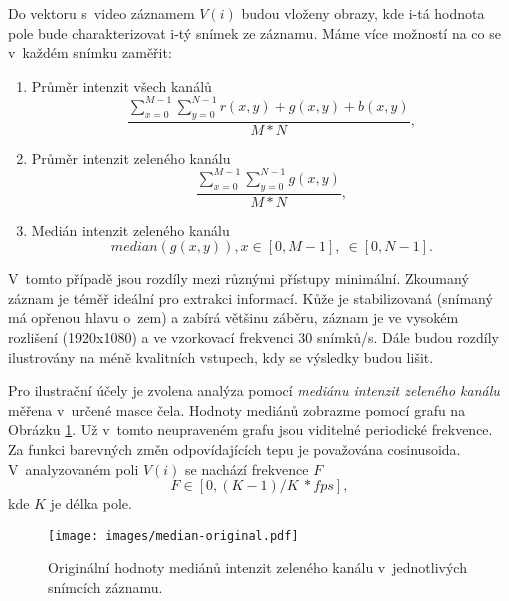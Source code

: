 \documentclass[
  digital, %
  table,   %
%
  lof,     %
  lot,     %
]{fithesis3}
\begin{document}
Do vektoru s~video záznamem $V(i)$ budou vloženy obrazy, kde i-tá hodnota pole bude charakterizovat i-tý snímek ze záznamu. Máme více možností na co se v~každém snímku zaměřit:
\begin{enumerate}
  \item{Průměr intenzit všech kanálů}
  \begin{equation}
    \frac{\sum_{x=0}^{M-1} \sum_{y=0}^{N-1} r(x,y) + g(x,y) + b(x,y)}{M*N},
    \label{suma-all-channels}
  \end{equation}
  
  \item{Průměr intenzit zeleného kanálu}
  \begin{equation}
    \frac{\sum_{x=0}^{M-1} \sum_{y=0}^{N-1} g(x,y)}{M*N},
    \label{suma-green-channel}
  \end{equation}
  
  \item{Medián intenzit zeleného kanálu}
  \begin{equation}
    median(g(x,y)), x \in [0, M-1], \ \in [0, N-1].
    \label{median-green-values}
  \end{equation}
  
\end{enumerate}

V~tomto případě jsou rozdíly mezi různými přístupy minimální. Zkoumaný záznam je téměř ideální pro extrakci informací. Kůže je stabilizovaná (snímaný má opřenou hlavu o~zem) a zabírá většinu záběru, záznam je ve vysokém rozlišení (1920x1080) a ve vzorkovací frekvenci 30 snímků/s. Dále budou rozdíly ilustrovány na méně kvalitních vstupech, kdy se výsledky budou lišit.

Pro ilustrační účely je zvolena analýza pomocí  \emph{mediánu intenzit zeleného kanálu} měřena v~určené masce čela. Hodnoty mediánů zobrazme pomocí grafu na Obrázku \ref{fig:median-original}. Už v~tomto neupraveném grafu jsou viditelné periodické frekvence. Za funkci barevných změn odpovídajících tepu je považována cosinusoida. V~analyzovaném poli $V(i)$ se nachází frekvence $F$
\begin{equation}
F \in [0, (K-1) / K~* fps],
\end{equation}
kde $K$ je délka pole.

\begin{figure}
  \begin{center}
    \texttt{[image: images/median-original.pdf]}
  \end{center}
  \caption{Originální hodnoty mediánů intenzit zeleného kanálu v~jednotlivých snímcích záznamu.}
  \label{fig:median-original}
\end{figure}
\end{document}
